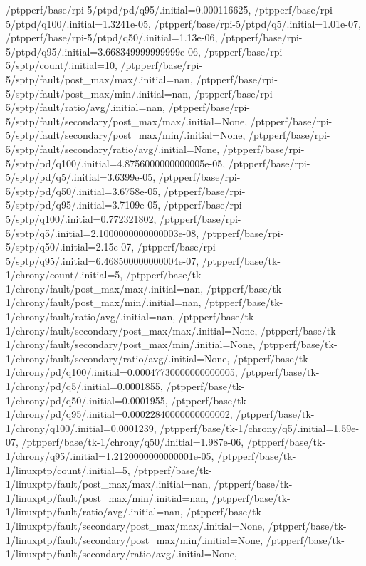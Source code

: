 {    /ptpperf/base/rpi-5/ptpd/pd/q95/.initial=0.000116625,
    /ptpperf/base/rpi-5/ptpd/q100/.initial=1.3241e-05,
    /ptpperf/base/rpi-5/ptpd/q5/.initial=1.01e-07,
    /ptpperf/base/rpi-5/ptpd/q50/.initial=1.13e-06,
    /ptpperf/base/rpi-5/ptpd/q95/.initial=3.668349999999999e-06,
    /ptpperf/base/rpi-5/sptp/count/.initial=10,
    /ptpperf/base/rpi-5/sptp/fault/post_max/max/.initial=nan,
    /ptpperf/base/rpi-5/sptp/fault/post_max/min/.initial=nan,
    /ptpperf/base/rpi-5/sptp/fault/ratio/avg/.initial=nan,
    /ptpperf/base/rpi-5/sptp/fault/secondary/post_max/max/.initial=None,
    /ptpperf/base/rpi-5/sptp/fault/secondary/post_max/min/.initial=None,
    /ptpperf/base/rpi-5/sptp/fault/secondary/ratio/avg/.initial=None,
    /ptpperf/base/rpi-5/sptp/pd/q100/.initial=4.8756000000000005e-05,
    /ptpperf/base/rpi-5/sptp/pd/q5/.initial=3.6399e-05,
    /ptpperf/base/rpi-5/sptp/pd/q50/.initial=3.6758e-05,
    /ptpperf/base/rpi-5/sptp/pd/q95/.initial=3.7109e-05,
    /ptpperf/base/rpi-5/sptp/q100/.initial=0.772321802,
    /ptpperf/base/rpi-5/sptp/q5/.initial=2.1000000000000003e-08,
    /ptpperf/base/rpi-5/sptp/q50/.initial=2.15e-07,
    /ptpperf/base/rpi-5/sptp/q95/.initial=6.468500000000004e-07,
    /ptpperf/base/tk-1/chrony/count/.initial=5,
    /ptpperf/base/tk-1/chrony/fault/post_max/max/.initial=nan,
    /ptpperf/base/tk-1/chrony/fault/post_max/min/.initial=nan,
    /ptpperf/base/tk-1/chrony/fault/ratio/avg/.initial=nan,
    /ptpperf/base/tk-1/chrony/fault/secondary/post_max/max/.initial=None,
    /ptpperf/base/tk-1/chrony/fault/secondary/post_max/min/.initial=None,
    /ptpperf/base/tk-1/chrony/fault/secondary/ratio/avg/.initial=None,
    /ptpperf/base/tk-1/chrony/pd/q100/.initial=0.00047730000000000005,
    /ptpperf/base/tk-1/chrony/pd/q5/.initial=0.0001855,
    /ptpperf/base/tk-1/chrony/pd/q50/.initial=0.0001955,
    /ptpperf/base/tk-1/chrony/pd/q95/.initial=0.00022840000000000002,
    /ptpperf/base/tk-1/chrony/q100/.initial=0.0001239,
    /ptpperf/base/tk-1/chrony/q5/.initial=1.59e-07,
    /ptpperf/base/tk-1/chrony/q50/.initial=1.987e-06,
    /ptpperf/base/tk-1/chrony/q95/.initial=1.2120000000000001e-05,
    /ptpperf/base/tk-1/linuxptp/count/.initial=5,
    /ptpperf/base/tk-1/linuxptp/fault/post_max/max/.initial=nan,
    /ptpperf/base/tk-1/linuxptp/fault/post_max/min/.initial=nan,
    /ptpperf/base/tk-1/linuxptp/fault/ratio/avg/.initial=nan,
    /ptpperf/base/tk-1/linuxptp/fault/secondary/post_max/max/.initial=None,
    /ptpperf/base/tk-1/linuxptp/fault/secondary/post_max/min/.initial=None,
    /ptpperf/base/tk-1/linuxptp/fault/secondary/ratio/avg/.initial=None,
}
